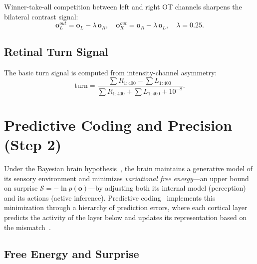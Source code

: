 \documentclass[11pt,a4paper]{article}
\begin{document}
Winner-take-all competition between left and right OT channels sharpens the
bilateral contrast signal:
\begin{equation}\label{eq:latinh}
  \mathbf{o}_L^{out} = \mathbf{o}_L - \lambda\,\mathbf{o}_R,
  \quad
  \mathbf{o}_R^{out} = \mathbf{o}_R - \lambda\,\mathbf{o}_L,
  \quad \lambda = 0.25.
\end{equation}

\subsection{Retinal Turn Signal}

The basic turn signal is computed from intensity-channel asymmetry:
\begin{equation}\label{eq:turn}
  \text{turn} =
  \frac{\sum R_{1:400} - \sum L_{1:400}}
       {\sum R_{1:400} + \sum L_{1:400} + 10^{-8}}.
\end{equation}

\section{Predictive Coding and Precision (Step 2)}\label{sec:precision}

Under the Bayesian brain hypothesis~\cite{friston2010,clark2013}, the brain
maintains a generative model of its sensory environment and minimizes
\emph{variational free energy}---an upper bound on surprise
$\mathcal{S} = -\ln p(\mathbf{o})$---by adjusting both its internal model
(perception) and its actions (active inference).
Predictive coding~\cite{rao1999} implements this minimization through a
hierarchy of prediction errors, where each cortical layer predicts the
activity of the layer below and updates its representation based on
the mismatch~\cite{bogacz2017}.

\subsection{Free Energy and Surprise}
\end{document}
